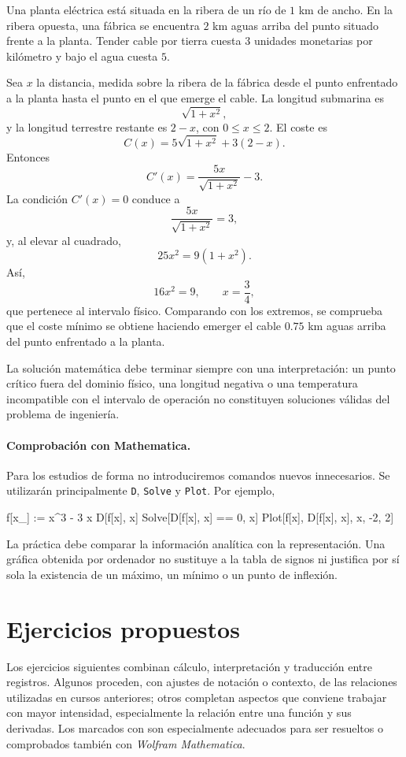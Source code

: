 \begin{example}
Una planta eléctrica está situada en la ribera de un río de $1$ km de ancho. En la ribera opuesta, una fábrica se encuentra $2$ km aguas arriba del punto situado frente a la planta. Tender cable por tierra cuesta $3$ unidades monetarias por kilómetro y bajo el agua cuesta $5$.

Sea $x$ la distancia, medida sobre la ribera de la fábrica desde el punto enfrentado a la planta hasta el punto en el que emerge el cable. La longitud submarina es
\[
\sqrt{1+x^2},
\]
y la longitud terrestre restante es $2-x$, con $0\leq x\leq2$. El coste es
\[
C(x)=5\sqrt{1+x^2}+3(2-x).
\]
Entonces
\[
C'(x)=\frac{5x}{\sqrt{1+x^2}}-3.
\]
La condición $C'(x)=0$ conduce a
\[
\frac{5x}{\sqrt{1+x^2}}=3,
\]
y, al elevar al cuadrado,
\[
25x^2=9(1+x^2).
\]
Así,
\[
16x^2=9,
\qquad
x=\frac34,
\]
que pertenece al intervalo físico. Comparando con los extremos, se comprueba que el coste mínimo se obtiene haciendo emerger el cable $0.75$ km aguas arriba del punto enfrentado a la planta.
\end{example}

La solución matemática debe terminar siempre con una interpretación: un punto crítico fuera del dominio físico, una longitud negativa o una temperatura incompatible con el intervalo de operación no constituyen soluciones válidas del problema de ingeniería.

\paragraph{Comprobación con Mathematica.}
Para los estudios de forma no introduciremos comandos nuevos innecesarios. Se utilizarán principalmente \texttt{D}, \texttt{Solve} y \texttt{Plot}. Por ejemplo,
\begin{mathematicacode}
f[x_] := x^3 - 3 x
D[f[x], x]
Solve[D[f[x], x] == 0, x]
Plot[{f[x], D[f[x], x]}, {x, -2, 2}]
\end{mathematicacode}
La práctica debe comparar la información analítica con la representación. Una gráfica obtenida por ordenador no sustituye a la tabla de signos ni justifica por sí sola la existencia de un máximo, un mínimo o un punto de inflexión.

\section*{Ejercicios propuestos}
\label{sec:ejercicios-t3}

Los ejercicios siguientes combinan cálculo, interpretación y traducción entre registros. Algunos proceden, con ajustes de notación o contexto, de las relaciones utilizadas en cursos anteriores; otros completan aspectos que conviene trabajar con mayor intensidad, especialmente la relación entre una función y sus derivadas. Los marcados con \M son especialmente adecuados para ser resueltos o comprobados también con \textit{Wolfram Mathematica}.

